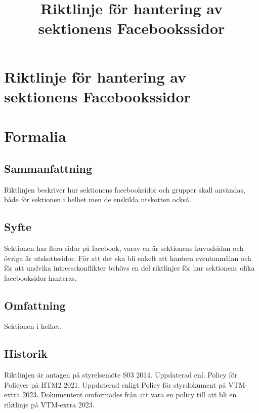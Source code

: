 \documentclass{dsekprotokoll}
\title{Riktlinje för hantering av sektionens Facebookssidor}
\author{}
\begin{document}
\section*{Riktlinje för hantering av sektionens Facebookssidor}
\section{Formalia}
\subsection{Sammanfattning}
Riktlinjen beskriver hur sektionens facebooksidor och grupper skall
användas, både för sektionen i helhet men de enskilda utskotten också.
\subsection{Syfte}
Sektionen har flera sidor på facebook, varav en är sektionens
huvudsidan och övriga är utskottssidor. För att det ska bli enkelt
att hantera eventanmälan och för att undvika intressekonflikter
behövs en del riktlinjer för hur sektionens olika facebooksidor hanteras.
\subsection{Omfattning}
Sektionen i helhet.
\subsection{Historik}
Riktlinjen är antagen på styrelsemöte S03 2014.
Uppdaterad enl. Policy för Policyer på HTM2 2021. Uppdaterad enligt
Policy för styrdokument på VTM-extra 2023. Dokumentent omformades
från att vara en policy till att bli en riktlinje på VTM-extra 2023.
\end{document}
